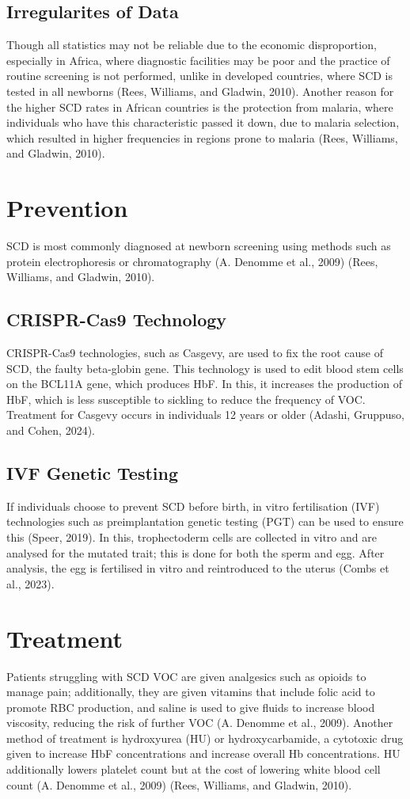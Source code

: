 \documentclass{mva_style}
\begin{document}
\subsection{Irregularites of Data}
Though all statistics may not be reliable due to the economic disproportion, especially in Africa, where diagnostic facilities may be poor and the practice of routine screening is not performed, unlike in developed countries, where SCD is tested in all newborns (Rees, Williams, and Gladwin, 2010).
Another reason for the higher SCD rates in African countries is the protection from malaria, where individuals who have this characteristic passed it down, due to malaria selection, which resulted in higher frequencies in regions prone to malaria (Rees, Williams, and Gladwin, 2010).  



\section{Prevention}
SCD is most commonly diagnosed at newborn screening using methods such as protein
electrophoresis or chromatography (A. Denomme et al., 2009) (Rees, Williams, and Gladwin, 2010).

\subsection{CRISPR-Cas9 Technology}
CRISPR-Cas9 technologies, such as Casgevy, are used to fix the root cause of SCD, the faulty beta-globin gene. This technology is used to edit blood stem cells on the BCL11A gene, which produces HbF. In this, it increases the production of HbF, which is less susceptible to sickling to reduce the frequency of VOC. Treatment for Casgevy occurs in individuals 12 years or older (Adashi, Gruppuso, and Cohen, 2024).
\subsection{IVF Genetic Testing}
If individuals choose to prevent SCD before birth, in vitro fertilisation (IVF) technologies such as preimplantation genetic testing (PGT) can be used to ensure this (Speer, 2019). In this, trophectoderm cells are collected in vitro and are analysed for the mutated trait; this is done for both the sperm and egg. After analysis, the egg is fertilised in vitro and reintroduced to the uterus (Combs et al., 2023). 

\section{Treatment}
Patients struggling with SCD VOC are given analgesics such as opioids to manage pain; additionally, they are given vitamins that include folic acid to promote RBC production, and saline is used to give fluids to increase blood viscosity, reducing the risk of further VOC (A. Denomme et al., 2009).
Another method of treatment is hydroxyurea (HU) or hydroxycarbamide, a cytotoxic drug given to increase HbF concentrations and increase overall Hb concentrations. HU additionally lowers platelet count but at the cost of lowering white blood cell count (A. Denomme et al., 2009) (Rees, Williams, and Gladwin, 2010).
\end{document}
